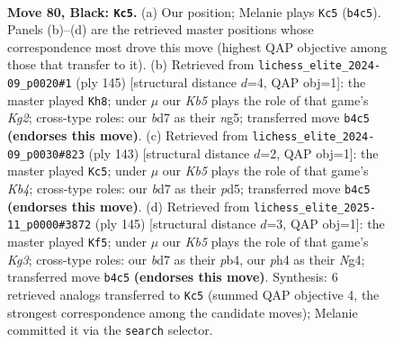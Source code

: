 \documentclass[11pt]{article}
\begin{document}
\clearpage

\begin{figure}[p]\centering
\begin{subfigure}{0.46\textwidth}\centering
\resizebox{\linewidth}{!}{%
\newchessgame
\chessboard[
  setfen={8/3B1P2/R7/8/1k5P/8/5K2/8 b - - 4 80},
  showmover=false,
  pgfstyle=straightmove, color=movearrow, markmove={b4-c5}
]}
\caption{}
\end{subfigure}\hfill
\begin{subfigure}{0.46\textwidth}\centering
\resizebox{\linewidth}{!}{%
\newchessgame
\chessboard[
  setfen={8/3K2k1/8/6N1/P7/8/8/5R2 b - - 9 73},
  showmover=false,
  pgfstyle=straightmove, color=movearrow, markmove={g7-h8}
]}
\caption{}
\end{subfigure}
\\[4pt]
\begin{subfigure}{0.46\textwidth}\centering
\resizebox{\linewidth}{!}{%
\newchessgame
\chessboard[
  setfen={8/5P2/8/1k1P2P1/7R/3K4/8/8 b - - 0 72},
  showmover=false,
  pgfstyle=straightmove, color=movearrow, markmove={b5-c5}
]}
\caption{}
\end{subfigure}\hfill
\begin{subfigure}{0.46\textwidth}\centering
\resizebox{\linewidth}{!}{%
\newchessgame
\chessboard[
  setfen={8/R7/3K2k1/8/1P1P2n1/8/8/8 b - - 4 73},
  showmover=false,
  pgfstyle=straightmove, color=movearrow, markmove={g6-f5}
]}
\caption{}
\end{subfigure}
\caption{\textbf{Move 80, Black: \texttt{Kc5}.} (a) Our position; Melanie plays \texttt{Kc5} (\texttt{b4c5}). Panels (b)--(d) are the retrieved master positions whose correspondence most drove this move (highest QAP objective among those that transfer to it). (b) Retrieved from \texttt{lichess\_elite\_2024-09\_p0020\#1} (ply 145) [structural distance $d$=4, QAP obj=1]: the master played \texttt{Kh8}; under $\mu$ our \emph{Kb5} plays the role of that game's \emph{Kg2}; cross-type roles: our \emph{b}d7 as their \emph{n}g5; transferred move \texttt{b4c5} \textbf{(endorses this move)}. (c) Retrieved from \texttt{lichess\_elite\_2024-09\_p0030\#823} (ply 143) [structural distance $d$=2, QAP obj=1]: the master played \texttt{Kc5}; under $\mu$ our \emph{Kb5} plays the role of that game's \emph{Kb4}; cross-type roles: our \emph{b}d7 as their \emph{p}d5; transferred move \texttt{b4c5} \textbf{(endorses this move)}. (d) Retrieved from \texttt{lichess\_elite\_2025-11\_p0000\#3872} (ply 145) [structural distance $d$=3, QAP obj=1]: the master played \texttt{Kf5}; under $\mu$ our \emph{Kb5} plays the role of that game's \emph{Kg3}; cross-type roles: our \emph{b}d7 as their \emph{p}b4, our \emph{p}h4 as their \emph{N}g4; transferred move \texttt{b4c5} \textbf{(endorses this move)}. Synthesis: 6 retrieved analogs transferred to \texttt{Kc5} (summed QAP objective 4, the strongest correspondence among the candidate moves); Melanie committed it via the \texttt{search} selector.}
\label{fig:thought-m159}
\end{figure}
\end{document}
